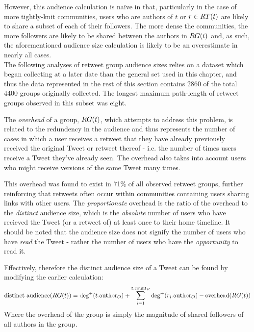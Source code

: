 However, this audience calculation is na{\"i}ve in that, particularly in the case of more tightly-knit communities, users who are authors of $t$ or $r \in RT(t)$ are likely to share a subset of each of their followers. The more dense the communities, the more followers are likely to be shared between the authors in $RG(t)$ and, as such, the aforementioned audience size calculation is likely to be an overestimate in nearly all cases.\\
The following analyses of retweet group audience sizes relies on a dataset which began collecting at a later date than the general set used in this chapter, and thus the data represented in the rest of this section contains 2860 of the total 4400 groups originally collected. The longest maximum path-length of retweet groups observed in this subset was eight.

The \textit{overhead} of a group, $RG(t)$, which attempts to address this problem, is related to the redundency in the audience and thus represents the number of cases in which a user receives a retweet that they have already previously received the original Tweet or retweet thereof - i.e. the number of times users receive a Tweet they've already seen. The overhead also takes into account users who might receive versions of the same Tweet many times.

This overhead was found to exist in 71\% of all observed retweet groups, further reinforcing that retweets often occur within communities containing users sharing links with other users. The \textit{proportionate} overhead is the ratio of the overhead to the \textit{distinct} audience size, which is the \textit{absolute} number of users who have recieved the Tweet (or a retweet of) at least once to their home timeline. It should be noted that the audience size does not signify the number of users who have \textit{read} the Tweet - rather the number of users who have the \textit{opportunity} to read it.

Effectively, therefore the distinct audience size of a Tweet can be found by modifying the earlier calculation:
\[
	\textrm{distinct audience}(RG(t)) = \textrm{deg}^+(t.\textrm{author}_O) + \sum\limits_{i=1}^{t.\textrm{count}_R} \textrm{deg}^+(r_i.\textrm{author}_O) - \textrm{overhead}(RG(t))
\]
Where the overhead of the group is simply the magnitude of shared followers of all authors in the group.

